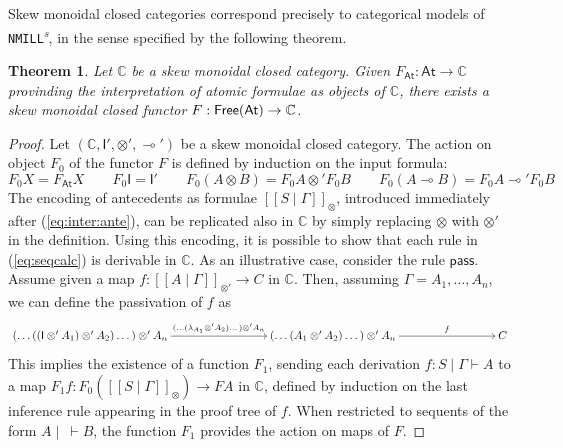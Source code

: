 \documentclass[submission,copyright,creativecommons]{eptcs}
\newtheorem{theorem}{Theorem}[section]
\theoremstyle{definition}
\newcommand{\ldbc}{[\![}
\newcommand{\rdbc}{]\!]}
\newcommand{\pass}{\mathsf{pass}}
\newcommand{\ot}{\otimes}
\newcommand{\lolli}{\multimap}
\newcommand{\I}{\mathsf{I}}
\newcommand{\NMILL}{\texttt{NMILL}}
\newcommand{\SkNMILL}{\NMILL\textsuperscript{\textit{s}}}
\newcommand{\FSkMCC}{\textsf{Free}}
\begin{document}
Skew monoidal closed categories correspond precisely to categorical models of \SkNMILL, in the sense specified by the following theorem.
\begin{theorem}\label{thm:models}
  Let $\mathbb{C}$ be a skew monoidal closed category. Given $F_{\mathsf{At}} : \mathsf{At} \rightarrow \mathbb{C}$ provinding the interpretation of atomic formulae as objects of $\mathbb{C}$, there exists a skew monoidal closed functor $F : \text{\FSkMCC}(\mathsf{At}) \rightarrow \mathbb{C}$.
\end{theorem}
\begin{proof}
  Let $(\mathbb{C} , \I' , \ot' , \lolli')$ be a skew monoidal closed category.
  The action on object $F_0$ of the functor $F$ is defined by induction on the input formula:
  \begin{equation*}
    F_0X = F_{\mathsf{At}}X
    \qquad
    F_0\I = \I'
    \qquad
    F_0(A \ot B) = F_0A \ot' F_0B
    \qquad
    F_0(A \lolli B) = F_0A \lolli' F_0B
  \end{equation*}
  The encoding of antecedents as formulae $\ldbc S \mid \Gamma \rdbc_{\ot}$, introduced immediately after (\ref{eq:inter:ante}), can be replicated also in $\mathbb{C}$ by simply replacing $\ot$ with $\ot'$ in the definition. Using this encoding, it is possible to show that each rule in (\ref{eq:seqcalc}) is derivable in $\mathbb{C}$. As an illustrative case, consider the rule $\pass$. Assume given a map $f : \ldbc A \mid \Gamma \rdbc_{\ot'} \to C$ in $\mathbb{C}$. Then, assuming $\Gamma = A_1,\dots,A_n$, we can define the passivation of $f$ as
\[\xymatrixcolsep{7pc}
\xymatrix{
  (\dots ((\I \ot' A_1) \ot' A_2) \dots ) \ot' A_n
  \ar[r]^-{(\dots (\lambda_{A_1} \ot' A_2) \dots ) \ot' A_n} &
  (\dots (A_1 \ot' A_2) \dots ) \ot' A_n
  \ar[r]^-{f} &
  C
}
\]
This implies the existence of a function $F_1$, sending each derivation $f : S \mid \Gamma \vdash A$ to a map $F_1f : F_0(\ldbc S \mid \Gamma \rdbc_{\ot}) \to FA$ in $\mathbb{C}$, defined by induction on the last inference rule appearing in the proof tree of $f$. When restricted to sequents of the form $A \mid ~ \vdash B$, the function $F_1$ provides the action on maps of $F$.

\end{proof}
\end{document}
